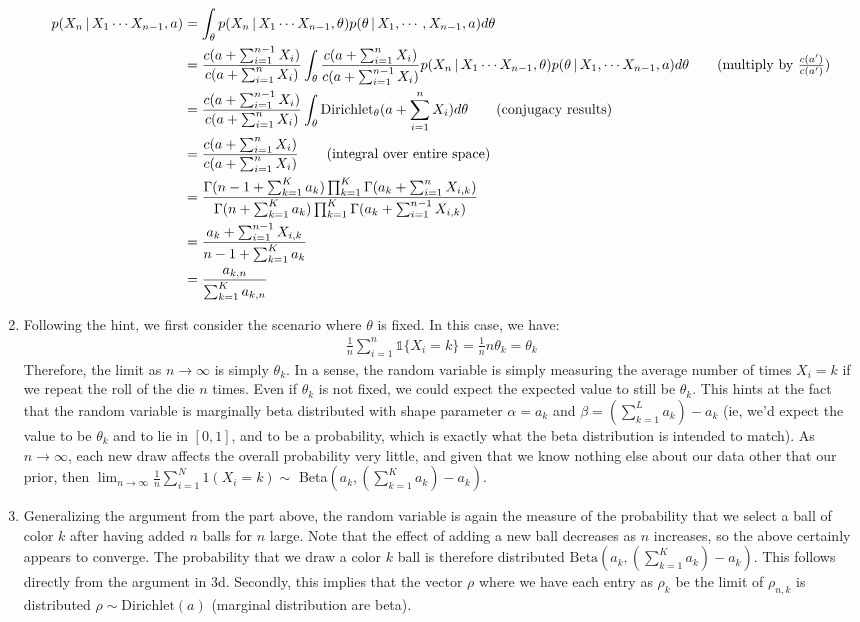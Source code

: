 \documentclass[submit]{harvardml}
\newcommand{\given}{\,|\,}
\theoremstyle{plain}
\begin{document}
\begin{enumerate}[label=(\alph*)]
\begin{align*}
p(X_n \given X_1 \cdots X_{n-1},a) &= \int_{\theta} p(X_n \given  X_1 \cdots X_{n-1}, \theta)p(\theta \given X_1, \cdots, X_{n-1}, a)  d\theta \\
&= \frac{c(a + \sum_{i=1}^{n-1}X_i)}{c(a + \sum_{i=1}^n X_i)} \int_{\theta} \frac{c(a + \sum_{i=1}^n X_i)}{c(a + \sum_{i=1}^{n-1}X_i)} p(X_n \given  X_1 \cdots X_{n-1}, \theta)p(\theta \given X_1, \cdots X_{n-1}, a) d\theta \tag{multiply by $\frac{c(a')}{c(a')}$} \\
&= \frac{c(a + \sum_{i=1}^{n-1}X_i)}{c(a + \sum_{i=1}^n X_i)} \int_{\theta} \text{Dirichlet}_{\theta}(a + \sum_{i=1}^n X_i) d\theta \tag{conjugacy results}\\
&= \frac{c(a + \sum_{i=1}^n X_i)}{c(a + \sum_{i=1}^n X_i)} \tag{integral over entire space} \\
&= \frac{\Gamma(n - 1 + \sum_{k=1}^{K}{a_k})\prod_{k=1}^K \Gamma(a_k + \sum_{i=1}^n X_{i,k})}{\Gamma(n + \sum_{k=1}^K a_k)\prod_{k=1}^K \Gamma(a_k + \sum_{i=1}^{n-1}X_{i,k})} \\
&= \frac{a_k + \sum_{i=1}^{n-1}X_{i,k}}{n - 1 + \sum_{k=1}^K a_k}\\
&= \frac{a_{k,n}}{\sum_{k=1}^K a_{k,n}}
\end{align*}
\item Following the hint, we first consider the scenario where $\theta$ is fixed. In this case, we have:
\begin{align*}
\frac{1}{n} \sum_{i=1}^n \mathbb{1} \{X_i = k\} =  \frac{1}{n}n\theta_k = \theta_k
\end{align*}
Therefore, the limit as $n \to \infty$ is simply $\theta_k$. In a sense, the random variable is simply measuring the average number of times $X_i = k$ if we repeat the roll of the die $n$ times. Even if $\theta_k$ is not fixed, we could expect the expected value to still be $\theta_k$. This hints at the fact that the random variable is marginally beta distributed with shape parameter $\alpha = a_k$ and $\beta = \left(\sum_{k=1}^L a_k \right) - a_k$ (ie, we'd expect the value to be $\theta_k$ and to lie in $[0,1]$, and to be a probability, which is exactly what the beta distribution is intended to match). As $n \to \infty$, each new draw affects the overall probability very little, and given that we know nothing else about our data other that our prior, then  $\lim_{n\to\infty} \frac{1}{n}\sum_{i=1}^{N} \mathcal{1} (X_{i} = k) \sim$ Beta$(a_k, \left(\sum_{k=1}^K a_k \right) - a_k)$.

\item Generalizing the argument from the part above, the random variable is again the measure of the probability that we select a ball of color $k$ after having added $n$ balls for $n$ large. Note that the effect of adding a new ball decreases as $n$ increases, so the above certainly appears to converge. The probability that we draw a color $k$ ball is therefore distributed $\text{Beta}(a_k, \left(\sum_{k=1}^K a_k \right) - a_k)$. This follows directly from the argument in 3d. Secondly, this implies that the vector $\rho$ where we have each entry as $\rho_{k}$ be the limit of $\rho_{n,k}$ is distributed $\rho \sim \text{Dirichlet}(a)$ (marginal distribution are beta).


\end{enumerate}
\end{document}
